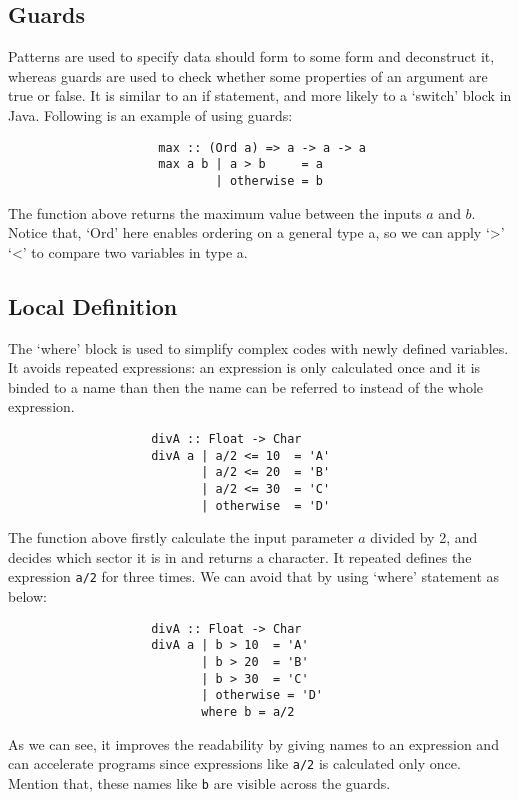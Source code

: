 \subsection{Guards}

Patterns are used to specify data should form to some form and deconstruct it, whereas guards are used to check whether some properties of an argument are true or false. It is similar to an if statement, and more likely to a `switch' block in Java. Following is an example of using guards:
\begin{verbatim}
                     max :: (Ord a) => a -> a -> a
                     max a b | a > b     = a
                             | otherwise = b
\end{verbatim}
The function above returns the maximum value between the inputs $a$ and $b$. Notice that, `Ord' here enables ordering on a general type a, so we can apply `>' `<' to compare two variables in type a.

\subsection{Local Definition}

The `where' block is used to simplify complex codes with newly defined variables. It avoids repeated expressions: an expression is only calculated once and it is binded to a name than then the name can be referred to instead of the whole expression. 

\begin{verbatim}
                    divA :: Float -> Char
                    divA a | a/2 <= 10  = 'A' 
                           | a/2 <= 20  = 'B'
                           | a/2 <= 30  = 'C'
                           | otherwise  = 'D'
\end{verbatim}

The function above firstly calculate the input parameter $a$ divided by 2, and decides which sector it is in and returns a character. It repeated defines the expression \verb|a/2| for three times. We can avoid that by using `where' statement as below: 
\begin{verbatim}
                    divA :: Float -> Char
                    divA a | b > 10  = 'A' 
                           | b > 20  = 'B'
                           | b > 30  = 'C'
                           | otherwise = 'D'
                           where b = a/2
\end{verbatim}

As we can see, it improves the readability by giving names to an expression and can accelerate programs since expressions like \verb|a/2| is calculated only once. Mention that, these names like \verb|b| are visible across the guards. 

